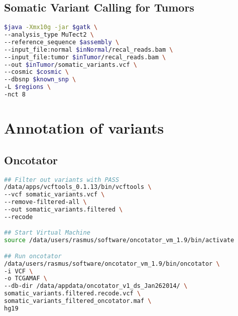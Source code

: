 \documentclass[10pt, a4paper]{report}
\begin{document}
\section{Somatic Variant Calling for Tumors}
\begin{lstlisting}[language=bash]
$java -Xmx10g -jar $gatk \
--analysis_type MuTect2 \
--reference_sequence $assembly \
--input_file:normal $inNormal/recal_reads.bam \
--input_file:tumor $inTumor/recal_reads.bam \
--out $inTumor/somatic_variants.vcf \
--cosmic $cosmic \
--dbsnp $known_snp \
-L $regions \
-nct 8
\end{lstlisting}

\chapter{Annotation of variants}
\section{Oncotator}
\begin{lstlisting}[language=bash]
## Filter out variants with PASS
/data/apps/vcftools_0.1.13/bin/vcftools \
--vcf somatic_variants.vcf \
--remove-filtered-all \
--out somatic_variants.filtered \
--recode

## Start Virtual Machine
source /data/users/rasmus/software/oncotator_vm_1.9/bin/activate

## Run oncotator
/data/users/rasmus/software/oncotator_vm_1.9/bin/oncotator \
-i VCF \
-o TCGAMAF \
--db-dir /data/appdata/oncotator_v1_ds_Jan262014/ \
somatic_variants.filtered.recode.vcf \
somatic_variants_filtered_oncotator.maf \
hg19

\end{lstlisting}
\end{document}
